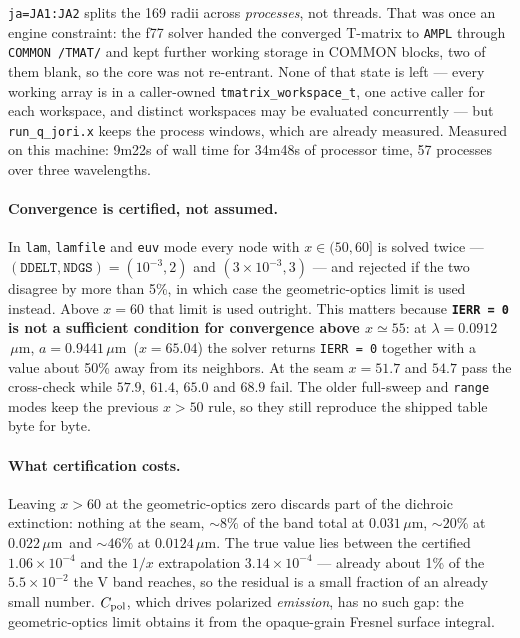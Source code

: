 \documentclass{my_memo}
\newcommand{\code}[1]{\texttt{#1}}
\newcommand{\um}{\ensuremath{\,\mu\mathrm{m}}}
\begin{document}
\code{ja=JA1:JA2} splits the 169 radii across \emph{processes}, not threads. That
was once an engine constraint: the f77 solver handed the converged T-matrix to
\code{AMPL} through \code{COMMON /TMAT/} and kept further working storage in
COMMON blocks, two of them blank, so the core was not re-entrant. None of that
state is left --- every working array is in a caller-owned
\code{tmatrix\_workspace\_t}, one active caller for each workspace, and distinct
workspaces may be evaluated concurrently --- but \code{run\_q\_jori.x} keeps the
process windows, which are already measured. Measured on this machine: 9m22s of
wall time for 34m48s of processor time, 57 processes over three wavelengths.

\paragraph{Convergence is certified, not assumed.} In \code{lam},
\code{lamfile} and \code{euv} mode every node with $x\in(50,60]$ is solved twice
--- $(\code{DDELT},\code{NDGS}) = (10^{-3},2)$ and $(3\times10^{-3},3)$ --- and
rejected if the two disagree by more than 5\%, in which case the
geometric-optics limit is used instead. Above $x = 60$ that limit is used
outright. This matters because \textbf{\code{IERR = 0} is not a sufficient
condition for convergence above $x\simeq55$}: at $\lambda = 0.0912$\um,
$a = 0.9441$\um\ ($x = 65.04$) the solver returns \code{IERR = 0} together with a
value about 50\% away from its neighbors. At the seam $x = 51.7$ and $54.7$ pass
the cross-check while $57.9$, $61.4$, $65.0$ and $68.9$ fail. The older
full-sweep and \code{range} modes keep the previous $x > 50$ rule, so they still
reproduce the shipped table byte for byte.

\paragraph{What certification costs.} Leaving $x>60$ at the geometric-optics
zero discards part of the dichroic extinction: nothing at the seam, $\sim8\%$ of
the band total at $0.031$\um, $\sim20\%$ at $0.022$\um\ and $\sim46\%$ at
$0.0124$\um. The true value lies between the certified $1.06\times10^{-4}$ and
the $1/x$ extrapolation $3.14\times10^{-4}$ --- already about 1\% of the
$5.5\times10^{-2}$ the V band reaches, so the residual is a small fraction of an
already small number. $C_{\rm pol}$, which drives polarized \emph{emission}, has
no such gap: the geometric-optics limit obtains it from the opaque-grain Fresnel
surface integral.
\end{document}
